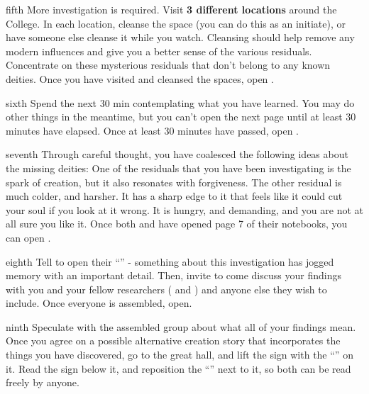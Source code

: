 \documentclass[notebook]{GL2020} %
\begin{document}
\begin{page}{fifth}
More investigation is required. Visit \textbf{3 different locations} around the College. In each location, cleanse the space (you can do this as an initiate), or have someone else cleanse it while you watch. Cleansing should help remove any modern influences and give you a better sense of the various residuals. Concentrate on these mysterious residuals that don’t belong to any known deities. Once you have visited and cleansed the spaces, open .
\end{page}

\begin{page}{sixth}
Spend the next 30 min contemplating what you have learned. You may do other things in the meantime, but you can’t open the next page until at least 30 minutes have elapsed. Once at least 30 minutes have passed, open .
\end{page}

\begin{page}{seventh}
Through careful thought, you have coalesced the following ideas about the missing deities: One of the residuals that you have been investigating is the spark of creation, but it also resonates with forgiveness. The other residual is much colder, and harsher. It has a sharp edge to it that feels like it could cut your soul if you look at it wrong. It is hungry, and demanding, and you are not at all sure you like it.  Once both \cHeadScientist{} and \cEbbPriest{} have opened page 7 of their notebooks, you can open .
\end{page}

\begin{page}{eighth}
Tell \cDisney{} to open their “\mWThree{\MYname}” - something about this investigation has jogged \cDisney{\their} memory with an important detail. Then, invite \cDisney{} to come discuss your findings with you and your fellow researchers ( \cHeadScientist{} and \cEbbPriest{}) and anyone else they wish to include.  Once everyone is assembled, open.
\end{page}

\begin{page}{ninth}
Speculate with the assembled group about what all of your findings mean. Once you agree on a possible alternative creation story that incorporates the things you have discovered, go to the great hall, and lift the sign with the ``\sCreationMythOfficial{}'' on it. Read the sign below it, and reposition the ``\sCreationMythOfficial{}'' next to it, so both can be read freely by anyone.
\end{page}

\endnotebook
\end{document}
